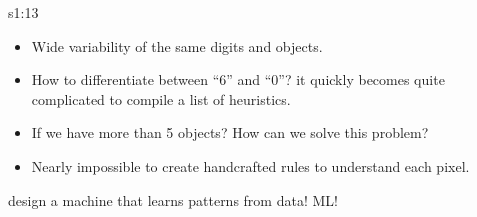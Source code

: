 \documentclass{tron}
\begin{document}
\begin{remark}{s1:13}
	\begin{itemize}
		\item Wide variability of the same digits and objects.
		\item How to differentiate between “6” and “0”? it quickly becomes quite complicated to compile a list of heuristics.
		\item If we have more than 5 objects? How can we solve this problem?
		\item Nearly impossible to create handcrafted rules to understand each pixel.
	\end{itemize}
	
	 design a machine that learns patterns from data!
	 \Gls{ML}!  
\end{remark}

\end{document}
